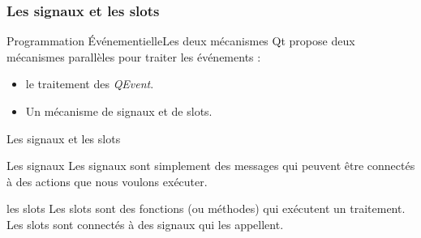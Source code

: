 \documentclass[12pt]{beamer}
\begin{document}
       \subsubsection{Les signaux et les slots}
            \begin{frame}{Programmation Événementielle}{Les deux mécanismes}
            Qt propose deux mécanismes parallèles pour traiter les événements :
            \begin{itemize}
            \item le traitement des \textit{QEvent}.
            \item Un mécanisme de signaux et de slots.
            \end{itemize}
            \end{frame}
            \begin{frame}{Les signaux et les slots}
                \begin{block}{Les signaux}
                    Les signaux sont simplement des messages qui peuvent être connectés à des actions que nous voulons exécuter.
                \end{block}
                \begin{block}{les slots}
        Les slots sont des fonctions (ou méthodes) qui exécutent un traitement.\\Les slots sont connectés à des signaux qui les appellent.
    \end{block}
    
    \end{frame}
    
\end{document}
